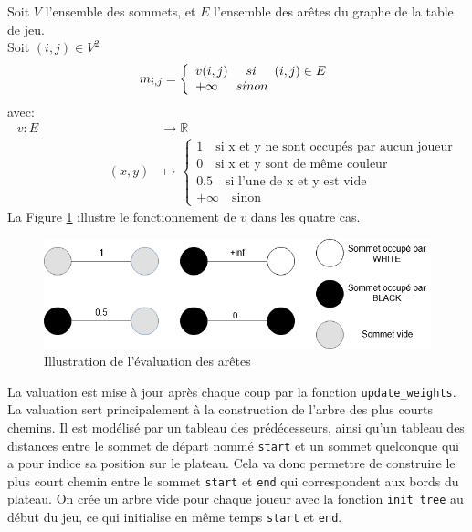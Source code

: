 \documentclass[a4paper, 12pt]{article}
\begin{document}
Soit $V$ l'ensemble des sommets, et $E$ l'ensemble des arêtes du graphe de la table de jeu.\\
Soit $(i,j)\in V^2$
\begin{equation}
  m_{i,j} = \left\{
    \begin{array}{ll}
      v(i,j) \hspace{.5cm} si \hspace{.5cm} (i,j)\in E\\
      +\infty \hspace{.5cm} sinon
    \end{array}
  \right.
  \label{weights eq}
\end{equation}
avec:
\begin{align*}
  v \colon E &\longrightarrow \mathbb{R}\\
  \hspace{3cm}(x,y) &\longmapsto \left\{
    \begin{array}{ll}
      1 \quad\text{si x et y ne sont occupés par aucun joueur}\\
      0 \quad\text{si x et y sont de même couleur}\\
      0.5 \quad\text{si l'une de x et y est vide}\\
      +\infty \quad\text{sinon}
    \end{array}
  \right.
\end{align*}
La Figure \ref{fig:eval} illustre le fonctionnement de $v$ dans les quatre cas.\\
\begin{figure}[h!]
  \centering
  \includegraphics[width=.8\linewidth]{./pictures/edges_evaluation.PNG}
  \caption{Illustration de l'évaluation des arêtes}
  \label{fig:eval}
\end{figure}

La valuation est mise à jour après chaque coup par la fonction \texttt{update\_weights}. La valuation sert principalement à la construction de l'arbre des plus courts chemins. Il est modélisé par un tableau des prédécesseurs, ainsi qu'un tableau des distances entre le sommet de départ nommé \texttt{start} et un sommet quelconque qui a pour indice sa position sur le plateau.  Cela va donc permettre de construire le plus court chemin entre le sommet \texttt{start} et \texttt{end} qui correspondent aux bords du plateau. On crée un arbre vide pour chaque joueur avec la fonction \texttt{init\_tree} au début du jeu, ce qui initialise en même temps \texttt{start} et \texttt{end}.
\end{document}
